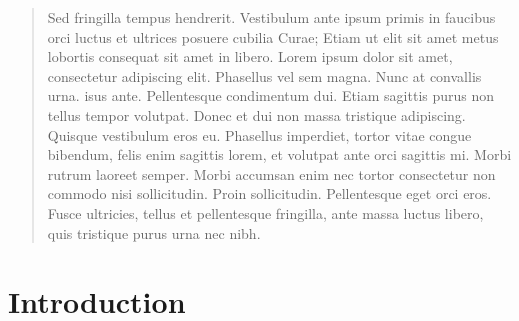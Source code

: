 \documentclass{article}
\begin{document}
\begin{multicols}{2} %



\color{DarkRed} %

\begin{abstract}

Sed fringilla tempus hendrerit. Vestibulum ante ipsum primis in faucibus orci luctus et ultrices posuere cubilia Curae; Etiam ut elit sit amet metus lobortis consequat sit amet in libero. Lorem ipsum dolor sit amet, consectetur adipiscing elit. Phasellus vel sem magna. Nunc at convallis urna. isus ante. Pellentesque condimentum dui. Etiam sagittis purus non tellus tempor volutpat. Donec et dui non massa tristique adipiscing. Quisque vestibulum eros eu. Phasellus imperdiet, tortor vitae congue bibendum, felis enim sagittis lorem, et volutpat ante orci sagittis mi. Morbi rutrum laoreet semper. Morbi accumsan enim nec tortor consectetur non commodo nisi sollicitudin. Proin sollicitudin. Pellentesque eget orci eros. Fusce ultricies, tellus et pellentesque fringilla, ante massa luctus libero, quis tristique purus urna nec nibh.

\end{abstract}



\color{Red} %

\section*{Introduction}


\end{multicols}
\end{document}

